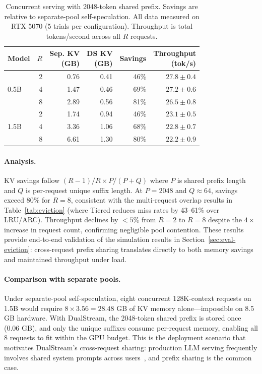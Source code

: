 \documentclass[review]{elsarticle}
\theoremstyle{definition}
\theoremstyle{remark}
\begin{document}
\begin{table}[t]
\centering
\caption{Concurrent serving with 2048-token shared prefix. Savings are
relative to separate-pool self-speculation. All data measured on RTX 5070
(5 trials per configuration). Throughput is total tokens/second across
all $R$ requests.}
\label{tab:concurrent}
\begin{tabular}{lrrrrr}
\toprule
Model & $R$ & \makecell{Sep. KV\\(GB)} & \makecell{DS KV\\(GB)} & Savings & \makecell{Throughput\\(tok/s)} \\
\midrule
\multirow{3}{*}{0.5B}
  & 2 & 0.76 & 0.41 & 46\% & $27.8 \pm 0.4$ \\
  & 4 & 1.47 & 0.46 & 69\% & $27.2 \pm 0.6$ \\
  & 8 & 2.89 & 0.56 & 81\% & $26.5 \pm 0.8$ \\
\midrule
\multirow{3}{*}{1.5B}
  & 2 & 1.74 & 0.94 & 46\% & $23.1 \pm 0.5$ \\
  & 4 & 3.36 & 1.06 & 68\% & $22.8 \pm 0.7$ \\
  & 8 & 6.61 & 1.30 & 80\% & $22.2 \pm 0.9$ \\
\bottomrule
\end{tabular}
\end{table}

\paragraph{Analysis.}
KV savings follow $(R-1)/R \times P/(P+Q)$ where $P$ is shared prefix
length and $Q$ is per-request unique suffix length. At $P=2048$ and
$Q \approx 64$, savings exceed 80\% for $R=8$, consistent with the
multi-request overlap results in Table~\ref{tab:eviction} (where Tiered
reduces miss rates by 43--61\% over LRU/ARC). Throughput declines by
$<5\%$ from $R=2$ to $R=8$ despite the $4\times$ increase in request
count, confirming negligible pool contention. These results provide
end-to-end validation of the simulation results in
Section~\ref{sec:eval-eviction}: cross-request prefix sharing translates
directly to both memory savings and maintained throughput under load.

\paragraph{Comparison with separate pools.}
Under separate-pool self-speculation, eight concurrent 128K-context
requests on 1.5B would require $8 \times 3.56 = 28.48$ GB of KV memory
alone---impossible on 8.5 GB hardware. With DualStream, the 2048-token
shared prefix is stored once (0.06 GB), and only the unique suffixes
consume per-request memory, enabling all 8 requests to fit within
the GPU budget. This is the deployment scenario that motivates
DualStream's cross-request sharing: production LLM serving frequently
involves shared system prompts across users~\cite{sharegpt}, and prefix
sharing is the common case.
\end{document}
